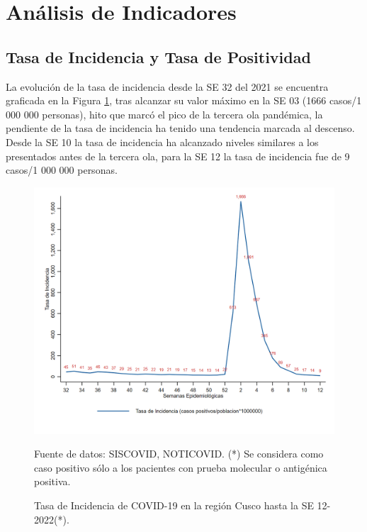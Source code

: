 \documentclass[12pt,a4paper,openany]{book}
\begin{document}

\clearpage

    \section*{Análisis de Indicadores}
   	\subsection*{Tasa de Incidencia y Tasa de Positividad}
\noindent La evolución de la tasa de incidencia desde la SE 32 del 2021 se encuentra graficada en la Figura \ref{fig:incidencia}, tras alcanzar su valor máximo en la SE 03 (1666 casos/1 000 000 personas), hito que marcó el pico de la tercera ola pandémica, la pendiente de la tasa de incidencia ha tenido una tendencia marcada al descenso. Desde la SE 10 la tasa de incidencia ha alcanzado niveles similares a los presentados antes de la tercera ola, para la SE 12 la tasa de incidencia fue de 9 casos/1 000 000 personas. 

  \begin{figure}[h]
  	\caption{Tasa de Incidencia de COVID-19 en la región Cusco hasta la SE 12-2022(*).  }\label{fig:incidencia}
  	\begin{center}
  		\includegraphics[width=0.80\linewidth]{../figuras/tasa_incidencia_2021_2022.png}
  	\end{center}
  	{\footnotesize {Fuente de datos: SISCOVID, NOTICOVID. (*) Se considera como caso positivo sólo a los pacientes con prueba molecular o antigénica positiva.}}
  \end{figure}
   
\end{document}
